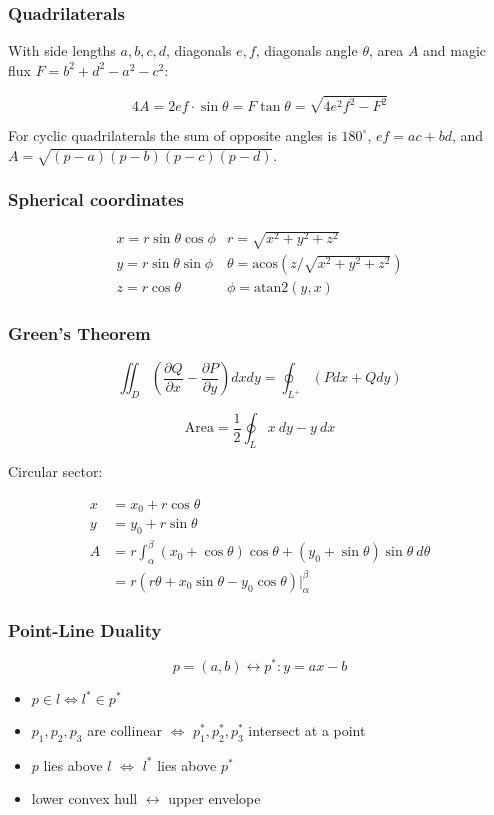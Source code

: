 \subsubsection{Quadrilaterals}
With side lengths $a,b,c,d$, diagonals $e, f$, diagonals angle $\theta$, area $A$ and
magic flux $F=b^2+d^2-a^2-c^2$:

\[ 4A = 2ef \cdot \sin\theta = F\tan\theta = \sqrt{4e^2f^2-F^2} \]

 For cyclic quadrilaterals the sum of opposite angles is $180^\circ$,
$ef = ac + bd$, and $A = \sqrt{(p-a)(p-b)(p-c)(p-d)}$.

\subsubsection{Spherical coordinates}
\[\begin{array}{cc}
x = r\sin\theta\cos\phi & r = \sqrt{x^2+y^2+z^2}\\
y = r\sin\theta\sin\phi & \theta = \textrm{acos}(z/\sqrt{x^2+y^2+z^2})\\
z = r\cos\theta & \phi = \textrm{atan2}(y,x)
\end{array}\]

\subsubsection{Green's Theorem}

\[ \iint_D \left( \frac{\partial Q}{\partial x} - \frac{\partial P}{\partial y} \right) dxdy
= \oint_{L^+} (Pdx + Qdy)\]

\[ \text{Area} = \frac{1}{2} \oint_L x\ dy - y\ dx \]

Circular sector:

\begin{align*}
    x &= x_0 + r\cos\theta \\
    y &= y_0 + r\sin\theta \\
    A &= r \int_\alpha^\beta (x_0 + \cos\theta)\cos\theta + (y_0 + \sin\theta)\sin\theta\ d\theta \\
      &= r (r \theta + x_0 \sin\theta - y_0 \cos\theta) \rvert_\alpha^\beta
\end{align*}

\subsubsection{Point-Line Duality}

\[ p=(a,b) \leftrightarrow p^*: y=ax-b \]

\begin{itemize}
    \item $p \in l \iff l^* \in p^*$
    \item $p_1, p_2, p_3$ are collinear $\iff$ $p_1^*, p_2^*, p_3^*$ intersect at a point
    \item $p$ lies above $l$ $\iff$ $l^*$ lies above $p^*$
    \item lower convex hull $\leftrightarrow$ upper envelope
\end{itemize}
